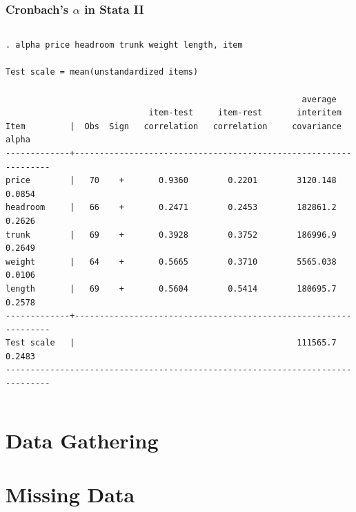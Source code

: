 \begin{frame}[fragile]
\frametitle{Cronbach's $\alpha$ in Stata II}
\scriptsize
\begin{columns}
\column{\dimexpr\paperwidth-25pt}
\begin{verbatim}
. alpha price headroom trunk weight length, item

Test scale = mean(unstandardized items)

                                                            average
                             item-test     item-rest       interitem
Item         |  Obs  Sign   correlation   correlation     covariance      alpha
-------------+-----------------------------------------------------------------
price        |   70    +       0.9360        0.2201        3120.148      0.0854
headroom     |   66    +       0.2471        0.2453        182861.2      0.2626
trunk        |   69    +       0.3928        0.3752        186996.9      0.2649
weight       |   64    +       0.5665        0.3710        5565.038      0.0106
length       |   69    +       0.5604        0.5414        180695.7      0.2578
-------------+-----------------------------------------------------------------
Test scale   |                                             111565.7      0.2483
-------------------------------------------------------------------------------
\end{verbatim}
\end{columns}
\end{frame}





\section{Data Gathering}
\frame{\tableofcontents[currentsection]}

\frame{
	\frametitle{}
}


\section{Missing Data}
\frame{\tableofcontents[currentsection]}


